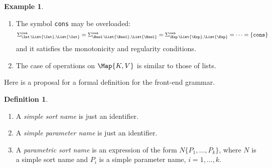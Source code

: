 \documentclass{article}
\theoremstyle{definition}
\newtheorem{example}{Example}[section]
\theoremstyle{definition}
\theoremstyle{definition}
\newtheorem{definition}{Definition}[section]
\theoremstyle{definition}
\theoremstyle{theorem}
\theoremstyle{theorem}
\theoremstyle{theorem}
\theoremstyle{theorem}
\theoremstyle{theorem}
\newcommand{\KWempty}[1]{\texttt{empty}\{#1\}}
\begin{document}
{\begin{example}
\begin{enumerate}
\begin{enumerate}
\[\]
then we loose the monotonicity. If we consider a distinguished symbol $\KWempty{\theta(V)}$ for each instance $\theta(V)$,
\begin{align*}
&\Sigma^\textrm{osa}_{\varepsilon,\List{\Int}}=\{\KWempty{\Int}\}\\
&\Sigma^\textrm{osa}_{\varepsilon,\List{\Bool}}=\{\KWempty{\Bool}\}\\
&\Sigma^\textrm{osa}_{\varepsilon,\List{\Exp}}=\{\KWempty{\Exp}\}\\
&\ldots
\end{align*}
we have, e.g., three unrelated terms of sort \List{\Exp}:  \KWempty{\Int}, \KWempty{\Bool}, \KWempty{\Exp}. In ML these term patterns are related with the corresponding instances of the  "aggressive" axiom on page~\pageref{axiom-parametric-symbol} (adapted for constants):
\begin{align*}
&\inj\{\List{\Int},\List{\Exp}\}(\KWempty{\Int})=\KWempty{\Exp}()\\
&\inj\{\List{\Bool},\List{\Exp}\}(\KWempty{\Bool})=\KWempty{\Exp}()
\end{align*}
Another solution to get a (monotonic) order-sorted signature is to forbid productions as above and use a new sort for the unique terminal:
\begin{align*}
&\syntax\ \texttt{EmptyList} ::= \texttt{empty}\\
&\syntax\{V\}\ \List{V} ::= \texttt{EmptyList}
\end{align*}
We get $\texttt{EmptyList}\le \List{\Int}$, $\texttt{EmptyList}\le \List{\Bool}$, $\texttt{EmptyList}\le \List{\Exp}$, $\texttt{EmptyList}\le \List{\List{\Int}}$, \ldots .

\item
The symbol \texttt{cons} may be overloaded:
\[
\Sigma^\textrm{osa}_{\Int\,\List{\Int},\List{\Int}}=\Sigma^\textrm{osa}_{\Bool\,\List{\Bool},\List{\Bool}}=\Sigma^\textrm{osa}_{\Exp\,\List{\Exp},\List{\Exp}}=\cdots=\{\texttt{cons}\}
\] 
and it satisfies the monotonicity and regularity conditions.
\item
The case of operations on $\Map{K,V}$ is similar to those of lists.
\end{enumerate}
\end{enumerate}

\end{example}

Here is a proposal for a formal definition for the front-end grammar.

\begin{definition}
\begin{enumerate}
\item A \emph{simple sort name} is   just an identifier.
\item A \emph{simple parameter name}  is   just an identifier.
\item A  \emph{parametric sort name} is an expression of the form $N\{P_1,\ldots,P_k\}$, where $N$ is a simple sort name and $P_i$ is a simple parameter name, $i=1,\ldots,k$.
\end{enumerate}


\end{definition}}
\end{document}
